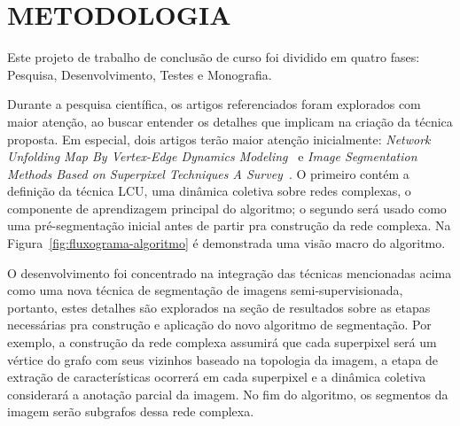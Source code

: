 \chapter{METODOLOGIA}\label{cap:metodologia}


Este projeto de trabalho de conclusão de curso foi dividido em quatro fases:
Pesquisa, Desenvolvimento, Testes e Monografia.

Durante a pesquisa científica, os artigos referenciados foram explorados com
maior atenção, ao buscar entender os detalhes que implicam
na criação da técnica proposta. Em especial, dois artigos terão maior
atenção inicialmente: \textit{Network Unfolding Map By Vertex-Edge
  Dynamics Modeling}~\cite{VerriNetworkUnfoldingMap2018} e
\textit{Image Segmentation Methods Based on Superpixel Techniques A
  Survey}~\cite{SuperpixelSurvey2020}. O primeiro contém a definição
da técnica LCU, uma dinâmica coletiva sobre redes complexas, o
componente de aprendizagem principal do algoritmo; o segundo será
usado como uma pré-segmentação inicial antes de partir pra construção
da rede complexa. Na Figura~\ref{fig:fluxograma-algoritmo} é demonstrada uma
visão macro do algoritmo.

\begin{figure}[!h]
        \captionsetup{width=8cm}
		\centering
\end{figure}


O desenvolvimento foi concentrado na integração das técnicas
mencionadas acima como uma nova técnica de segmentação de imagens
semi-supervisionada, portanto, estes detalhes são explorados na seção
de resultados sobre as etapas necessárias pra construção e aplicação
do novo algoritmo de segmentação. Por exemplo, a construção da rede
complexa assumirá que cada superpixel será um vértice do grafo com
seus vizinhos baseado na topologia da imagem, a etapa de extração de
características ocorrerá em cada superpixel e a dinâmica coletiva
considerará a anotação parcial da imagem. No fim do algoritmo, os
segmentos da imagem serão subgrafos dessa rede complexa.

